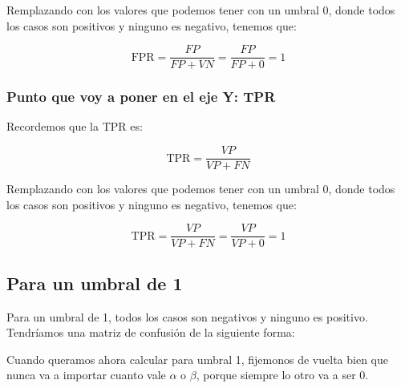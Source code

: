 \documentclass[12pt]{article}
\begin{document}
Remplazando con los valores que podemos tener con un umbral 0, donde todos los casos son positivos y ninguno es negativo, tenemos que:

\[
\text{FPR} = \frac{FP}{FP + VN} = \frac{FP}{FP + 0} = 1
\]

\subsubsection{Punto que voy a poner en el eje Y: TPR}

Recordemos que la TPR es:

\[
\text{TPR} = \frac{VP}{VP + FN}
\]

\vspace{0.3em}

Remplazando con los valores que podemos tener con un umbral 0, donde todos los casos son positivos y ninguno es negativo, tenemos que:

\[
\text{TPR} = \frac{VP}{VP + FN} = \frac{VP}{VP + 0} = 1
\]

\subsection{Para un umbral de 1}

Para un umbral de 1, todos los casos son negativos y ninguno es positivo. Tendríamos una matriz de confusión de la siguiente forma:

\begin{center}

\end{center}

Cuando queramos ahora calcular para umbral 1, fijemonos de vuelta bien que nunca va a importar cuanto vale $\alpha$ o $\beta$, porque siempre lo otro va a ser 0.
\end{document}
